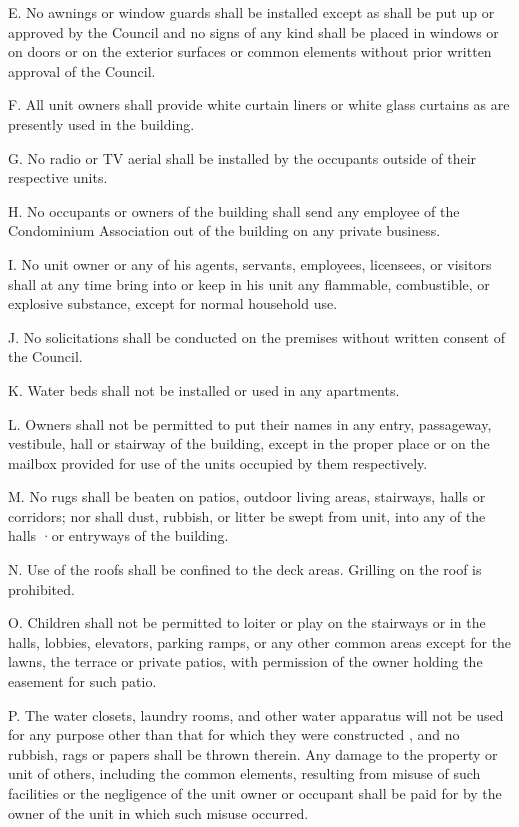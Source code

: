 \documentclass[
]{book}
\begin{document}
E. No awnings or window guards shall be installed except as shall be put up or approved by the Council and no signs of any kind shall be placed in windows or on doors or on the exterior surfaces or common elements without prior written approval of the Council.

F. All unit owners shall provide white curtain liners or white glass curtains as are presently used in the building.

G. No radio or TV aerial shall be installed by the occupants outside of their respective units.

H. No occupants or owners of the building shall send any employee of the Condominium Association out of the building on any private business.

I. No unit owner or any of his agents, servants, employees, licensees, or visitors shall at any time bring into or keep in his unit any flammable, combustible, or explosive substance, except for normal household use.

J. No solicitations shall be conducted on the premises without written consent of the Council.

K. Water beds shall not be installed or used in any apartments.

L. Owners shall not be permitted to put their names in any entry, passageway, vestibule, hall or stairway of the building, except in the proper place or on the mailbox provided for use of the units occupied by them respectively.

M. No rugs shall be beaten on patios, outdoor living areas, stairways, halls or corridors; nor shall dust, rubbish, or litter be swept from unit, into any of the halls ·or entryways of the building.

N. Use of the roofs shall be confined to the deck areas. Grilling on the roof is prohibited.

O. Children shall not be permitted to loiter or play on the stairways or in the halls, lobbies, elevators, parking ramps, or any other common areas except for the lawns, the terrace or private patios, with permission of the owner holding the easement for such patio.

P. The water closets, laundry rooms, and other water apparatus will not be used for any purpose other than that for which they were constructed , and no rubbish, rags or papers shall be thrown therein. Any damage to the property or unit of others, including the common elements, resulting from misuse of such facilities or the negligence of the unit owner or occupant shall be paid for by the owner of the unit in which such misuse occurred.
\end{document}
